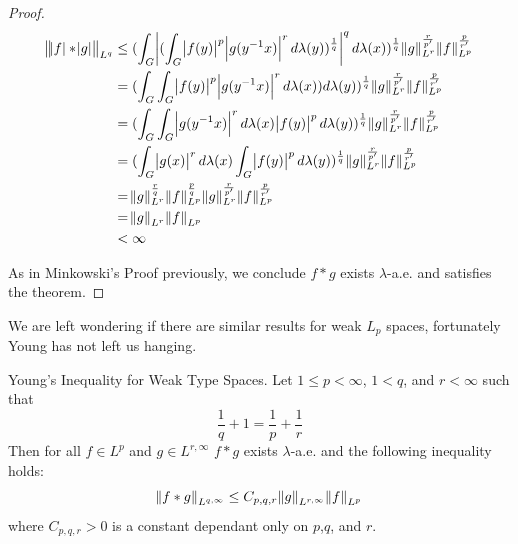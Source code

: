 \begin{proof}
\begin{align*}
\norm{\abs{f} \ast \abs{g}}_{L^q} &\leq (\int_G \abs{(\int_G \abs{f(y)}^p\abs{g(y^{-1}x)}^r d\lambda(y) )^\frac{1}{q}}^q d\lambda(x))^\frac{1}{q} \norm{g}^\frac{r}{p'}_{L^r} \norm{f}^\frac{p}{r'}_{L^p} \\
&= (\int_G\int_G \abs{f(y)}^p\abs{g(y^{-1}x)}^r d\lambda(x)) d\lambda(y) )^\frac{1}{q} \norm{g}^\frac{r}{p'}_{L^r} \norm{f}^\frac{p}{r'}_{L^p} \\
&= (\int_G\int_G \abs{g(y^{-1}x)}^r d\lambda(x) \abs{f(y)}^p d\lambda(y)  )^\frac{1}{q} \norm{g}^\frac{r}{p'}_{L^r} \norm{f}^\frac{p}{r'}_{L^p} \\
&= (\int_G \abs{g(x)}^r d\lambda(x) \int_G \abs{f(y)}^p d\lambda(y)  )^\frac{1}{q} \norm{g}^\frac{r}{p'}_{L^r} \norm{f}^\frac{p}{r'}_{L^p} \\
&= \norm{g}^\frac{r}{q}_{L^r} \norm{f}^\frac{p}{q}_{L^p} \norm{g}^\frac{r}{p'}_{L^r} \norm{f}^\frac{p}{r'}_{L^p} \\
&= \norm{g}_{L^r} \norm{f}_{L^p} \\
&< \infty
\end{align*}  

As in Minkowski's Proof previously, we conclude $f \ast g$ exists $\lambda$-a.e. and satisfies the theorem.
\end{proof}

We are left wondering if there are similar results for weak $L_p$ spaces, fortunately Young has not left us hanging.

\begin{theorem}
Young's Inequality for Weak Type Spaces. Let $1\leq p < \infty$, $1<q$, and $r<\infty$ such that
\begin{equation*}
\frac{1}{q}+1 = \frac{1}{p}+\frac{1}{r}
\end{equation*} 
Then for all $f \in L^p$ and $g \in L^{r,\infty}$ $f\ast g$ exists $\lambda$-a.e. and the following inequality holds:
\begin{equation*}
\norm{f \ast g}_{L^{q,\infty}} \leq C_{p,q,r}\norm{g}_{L^{r,\infty}} \norm{f}_{L^{p}}
\end{equation*}
where $C_{p,q,r} > 0$ is a constant dependant only on $p$,$q$, and $r$.
\end{theorem}


